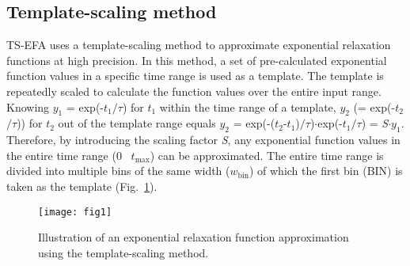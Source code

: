 \documentclass[10pt,journal]{IEEEtran}
\begin{document}
\subsection{Template-scaling method}\label{subsec:ts}
TS-EFA  uses a template-scaling method to approximate exponential relaxation functions at high precision.
In this method, a set of pre-calculated exponential function values in a specific time range is used as a template. The template is repeatedly scaled to calculate the function values over the entire input range. 
Knowing $y_1$ = exp(-$t_1$$\mathbin{/}$$\tau$) for $t_1$ within the time range of a template, $y_2$ (= exp(-$t_2$$\mathbin{/}$$\tau$)) for $t_2$ out of the template range equals $y_2$ = exp(-($t_2$-$t_1$)$\mathbin{/}$$\tau$)$\cdot$exp(-$t_1$$\mathbin{/}$$\tau$) = \textit{S}$\cdot$$y_1$. 
Therefore, by introducing the scaling factor \textit{S}, any exponential function values in the entire time range (0 \textendash~$t_\textrm{max}$) can be approximated. 
The entire time range is divided into multiple bins of the same width ($w_\textrm{bin}$) of which the first bin (BIN) is taken as the template (Fig.~\ref{fig:fig1}). 

\begin{figure}[tb]\centering
    \texttt{[image: fig1]}
    \caption{\label{fig:fig1} Illustration of an exponential relaxation function approximation using the template-scaling method.}
\end{figure}
\end{document}
